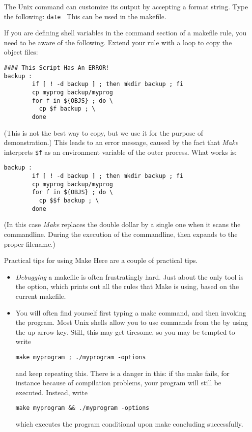 The Unix  command can customize its output by accepting a
format string. Type the following: 
%
\verb+date +%
%
This can be used in the makefile.


If you are defining shell variables in the command section of a
makefile rule, you need to be aware of the following. Extend your
 rule with a loop to copy the object files:
\begin{verbatim}
#### This Script Has An ERROR!
backup :
        if [ ! -d backup ] ; then mkdir backup ; fi
        cp myprog backup/myprog
        for f in ${OBJS} ; do \
          cp $f backup ; \
        done
\end{verbatim}
(This is not the best way to copy, but we use it for the purpose of
demonstration.) This leads to an error message, caused by the fact
that \emph{Make} interprets \verb+$f+ as an environment variable of
the outer process. What works is:
\begin{verbatim}
backup :
        if [ ! -d backup ] ; then mkdir backup ; fi
        cp myprog backup/myprog
        for f in ${OBJS} ; do \
          cp $$f backup ; \
        done
\end{verbatim}
(In this case \emph{Make} replaces the double dollar by a single one
when it scans the commandline. During the execution of the
commandline,  then expands to the proper filename.)

\Level 0 {Practical tips for using Make}
Here are a couple of practical tips.

\begin{itemize}
\item \emph{Debugging} a makefile is often
  frustratingly hard.  Just about the only tool is the  option,
  which prints out all the rules that Make is using, based on the
  current makefile.
\item You will often find yourself first typing a make command, and
  then invoking the program. Most Unix shells allow you to use
  commands from the \indextermbus{shell}{command history} by using the
  up arrow key. Still, this may get tiresome, so you may be tempted to
  write
\begin{verbatim}
make myprogram ; ./myprogram -options
\end{verbatim}
and keep repeating this.
There is a danger in this: if the make fails, for instance because of
compilation problems, your program will still be executed. Instead, write
\begin{verbatim}
make myprogram && ./myprogram -options
\end{verbatim}
which executes the program conditional upon make concluding successfully.
\end{itemize}


